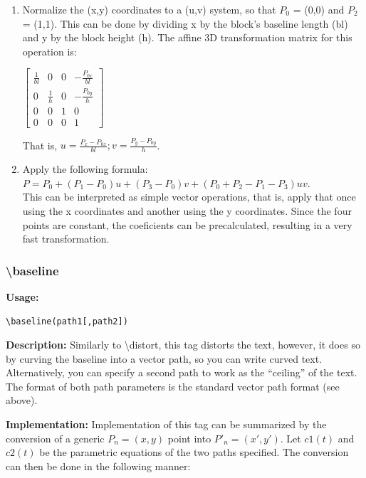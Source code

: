 \documentclass{spec}
\begin{document}
\begin{enumerate}
\item Normalize the (x,y) coordinates to a (u,v) system, so that $P_0$ = (0,0) and $P_2$ = (1,1).
This can be done by dividing x by the block's baseline length (bl) and y by the block height (h).
The affine 3D transformation matrix for this operation is:\\
\begin{center}
$\displaystyle \begin{bmatrix}
\frac{1}{bl} & 0 & 0 & -\frac{P_{0x}}{bl} \\
0 & \frac{1}{h} & 0 & -\frac{P_{0y}}{h} \\
0 & 0 & 1 & 0 \\
0 & 0 & 0 & 1
\end{bmatrix}$
\end{center}
That is, $\displaystyle u = \frac{P_x - P_{0x}}{bl}; v = \frac{P_y - P_{0y}}{h}$.
\item Apply the following formula: $P = P_0 + (P_1-P_0) u + (P_3-P_0) v + (P_0+P_2-P_1-P_3) u v$.\\
This can be interpreted as simple vector operations, that is, apply that once using the x coordinates
and another using the y coordinates. Since the four points are constant, the coeficients can be
precalculated, resulting in a very fast transformation.\\
\end{enumerate}

\subsubsection{\textbackslash baseline}

\textbf{Usage:}
\begin{verbatim}
\baseline(path1[,path2])
\end{verbatim}

\textbf{Description:}
Similarly to \textbackslash distort, this tag distorts the text, however, it does so by curving the
baseline into a vector path, so you can write curved text. Alternatively, you can specify a second
path to work as the ``ceiling'' of the text. The format of both path parameters is the standard
vector path format (see above).

\textbf{Implementation:}
Implementation of this tag can be summarized by the conversion of a generic $P_n = (x,y)$ point into
$P'_n = (x',y')$. Let $c1(t)$ and $c2(t)$ be the parametric equations of the two paths specified.
The conversion can then be done in the following manner:
\end{document}
